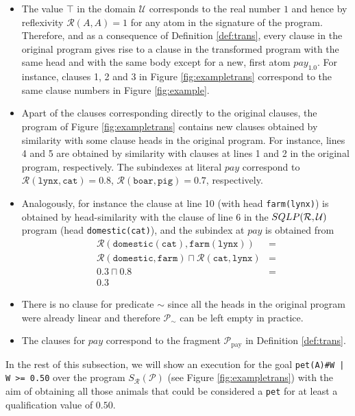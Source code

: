 \documentclass{sigplanconf}
\newcommand{\U}{\mathcal{U}}
\newcommand{\simrel}{\mathcal{R}}
\newcommand{\trans}[2]{S_{#1}(#2)}
\newcommand{\Prog}{\mathcal{P}} \newcommand{\UProg}{\mathcal{P_U}}
\theoremstyle{definition}
\theoremstyle{plain}
\begin{document}
\begin{itemize}
    \item The value $\top$ in the domain $\U$ corresponds to the real number $1$ and hence by reflexivity $\simrel(A,A) = 1$ for any atom in the signature of the program. Therefore, and as a consequence of Definition \ref{def:trans}, every clause in the original program gives rise to a clause in the transformed program with the same head and with the same body except for a new, first atom $pay_{1.0}$. For instance, clauses 1, 2 and 3 in Figure \ref{fig:exampletrans} correspond to the same clause numbers in Figure \ref{fig:example}.

    \item Apart of the clauses corresponding directly to the original clauses, the program of Figure \ref{fig:exampletrans} contains new clauses obtained by  similarity with some clause heads in the original program. For instance,  lines 4 and 5  are obtained by similarity with clauses at lines 1 and 2 in the original program, respectively. The  subindexes at literal $pay$ correspond to $\simrel(\mathtt{lynx}, \mathtt{cat})=0.8$, $\simrel(\mathtt{boar}, \mathtt{pig}) = 0.7$, respectively.

    \item Analogously, for instance the clause at line 10 (with head {\tt farm(lynx)}) is obtained by head-similarity with the clause of line 6 in the $\sqlp{\simrel}{\U}$ program (head {\tt domestic(cat)}), and the subindex at $pay$ is obtained from
 $$
 \begin{array}{ll}
 \simrel(\mathtt{domestic(cat)}, \mathtt{farm(lynx)}) &= \\
 \simrel(\mathtt{domestic}, \mathtt{farm}) \sqcap \simrel(\mathtt{cat}, \mathtt{lynx}) &= \\
                                    0.3 \sqcap 0.8 &= \\
                                    0.3
 \end{array}$$

    \item There is no clause for predicate $\sim$ since all the heads in the original program were already linear and therefore $\Prog_\sim$ can be left empty in practice.

    \item The clauses  for $pay$ correspond to the fragment $\Prog_{\mathrm{pay}}$ in Definition \ref{def:trans}.
\end{itemize}

In the rest of this subsection, we will show an execution for the goal \texttt{pet(A)\#W | W >= 0.50} over the program $\trans{\simrel}{\Prog}$ (see Figure \ref{fig:exampletrans}) with the aim of obtaining all those animals that could be considered a \texttt{pet} for at least a qualification value of $0.50$.
\end{document}
